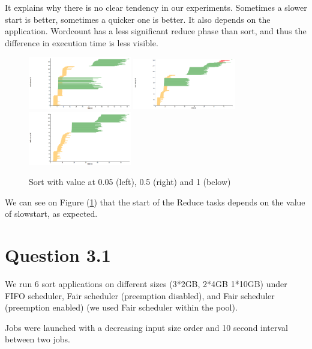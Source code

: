 \documentclass{article}
\begin{document}
It explains why there is no clear tendency in our experiments. Sometimes a slower start is better, sometimes a quicker one is better. It also depends on the application. Wordcount has a less significant reduce phase than sort, and thus the difference in execution time is less visible.



\begin{figure}%
  \centering
  \includegraphics[width=0.4\textwidth]{sort005.png}
  \includegraphics[width=0.4\textwidth]{sort05.png}
  \includegraphics[width=0.4\textwidth]{sort1.png}
  \caption{Sort with value at 0.05 (left), 0.5 (right) and 1 (below)}
  \label{values}
\end{figure}

We can see on Figure (\ref{values}) that the start of the Reduce tasks depends on the value of slowstart, as expected.



\section*{Question 3.1}


We run 6 sort applications on different sizes (3*2GB, 2*4GB 1*10GB) under FIFO scheduler, Fair scheduler (preemption disabled), and Fair scheduler
(preemption enabled) (we used Fair scheduler within the pool).

Jobs were launched with a decreasing input size order and 10 second interval between two
jobs.

\end{document}
